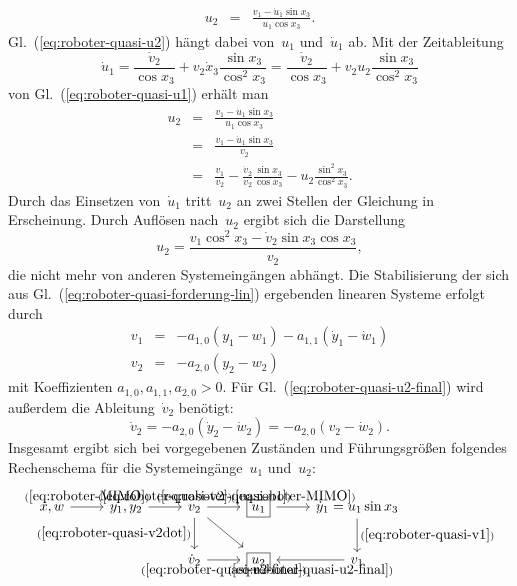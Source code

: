 \begin{example}
\begin{eqnarray}
u_{2} & = & \frac{v_{1}-\dot{u}_{1}\sin x_{3}}{u_{1}\cos x_{3}}.\label{eq:roboter-quasi-u2}
\end{eqnarray}
Gl.~(\ref{eq:roboter-quasi-u2}) hängt dabei von~$u_{1}$ und~$\dot{u}_{1}$
ab. Mit der Zeitableitung 
\[
\dot{u}_{1}=\frac{\dot{v}_{2}}{\cos x_{3}}+v_{2}\dot{x}_{3}\frac{\sin x_{3}}{\cos^{2}x_{3}}=\frac{\dot{v}_{2}}{\cos x_{3}}+v_{2}u_{2}\frac{\sin x_{3}}{\cos^{2}x_{3}}
\]
von Gl.~(\ref{eq:roboter-quasi-u1}) erhält man
\begin{eqnarray*}
u_{2} & = & \frac{v_{1}-\dot{u}_{1}\sin x_{3}}{u_{1}\cos x_{3}}\\
 & = & \frac{v_{1}-\dot{u}_{1}\sin x_{3}}{v_{2}}\\
 & = & \frac{v_{1}}{v_{2}}-\frac{\dot{v}_{2}}{v_{2}}\frac{\sin x_{3}}{\cos x_{3}}-u_{2}\frac{\sin^{2}x_{3}}{\cos^{2}x_{3}}.
\end{eqnarray*}
Durch das Einsetzen von~$\dot{u}_{1}$ tritt~$u_{2}$ an zwei Stellen
der Gleichung in Erscheinung. Durch Auflösen nach~$u_{2}$ ergibt
sich die Darstellung
\begin{equation}
u_{2}=\frac{v_{1}\cos^{2}x_{3}-\dot{v}_{2}\sin x_{3}\cos x_{3}}{v_{2}},\label{eq:roboter-quasi-u2-final}
\end{equation}
die nicht mehr von anderen Systemeingängen abhängt. Die Stabilisierung
der sich aus Gl.~(\ref{eq:roboter-quasi-forderung-lin}) ergebenden
linearen Systeme erfolgt durch
\begin{eqnarray}
v_{1} & = & -a_{1,0}(y_{1}-w_{1})-a_{1,1}(\dot{y}_{1}-\dot{w}_{1})\label{eq:roboter-quasi-v1}\\
v_{2} & = & -a_{2,0}(y_{2}-w_{2})\label{eq:roboter-quasi-v2}
\end{eqnarray}
mit Koeffizienten $a_{1,0},a_{1,1},a_{2,0}>0$. Für Gl.~(\ref{eq:roboter-quasi-u2-final})
wird außerdem die Ableitung~$\dot{v}_{2}$ benötigt:
\begin{equation}
\dot{v}_{2}=-a_{2,0}(\dot{y}_{2}-\dot{w}_{2})=-a_{2,0}(v_{2}-\dot{w}_{2}).\label{eq:roboter-quasi-v2dot}
\end{equation}
Insgesamt ergibt sich bei vorgegebenen Zuständen und Führungsgrößen
folgendes Rechenschema für die Systemeingänge~$u_{1}$ und~$u_{2}$:\[
\begin{tikzcd}
x,w
\arrow{r}[above]{(\ref{eq:roboter-MIMO})} & %
y_1,y_2\arrow{r}[above]{(\ref{eq:roboter-quasi-v2})} &
v_2 \arrow{r}[above]{(\ref{eq:roboter-quasi-u1})} 
\arrow{d}[left]{(\ref{eq:roboter-quasi-v2dot})}
\arrow{rd} &
\boxed{u_1} \arrow{r}[above]{(\ref{eq:roboter-MIMO})} & 
\dot{y}_1=u_1\sin x_3 \arrow{d}[right]{(\ref{eq:roboter-quasi-v1})} \\
&& \dot{v}_2 \arrow{r}[below]{(\ref{eq:roboter-quasi-u2-final})}&
\boxed{u_2} &
v_1 \arrow{l}[below]{(\ref{eq:roboter-quasi-u2-final})}
\end{tikzcd}
\]


\end{example}
